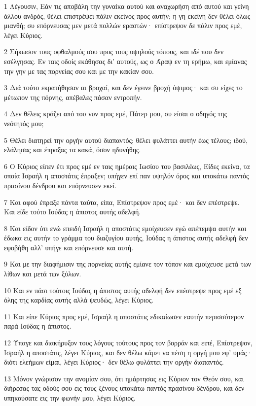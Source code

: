 \par 1 Λέγουσιν, Εάν τις αποβάλη την γυναίκα αυτού και αναχωρήση από αυτού και γείνη άλλου ανδρός, θέλει επιστρέψει πάλιν εκείνος προς αυτήν; η γη εκείνη δεν θέλει όλως μιανθή; συ επόρνευσας μεν μετά πολλών εραστών· επίστρεψον δε πάλιν προς εμέ, λέγει Κύριος.
\par 2 Σήκωσον τους οφθαλμούς σου προς τους υψηλούς τόπους, και ιδέ που δεν εσέλγησας. Εν ταις οδοίς εκάθησας δι' αυτούς, ως ο Άραψ εν τη ερήμω, και εμίανας την γην με τας πορνείας σου και με την κακίαν σου.
\par 3 Διά τούτο εκρατήθησαν αι βροχαί, και δεν έγεινε βροχή όψιμος· και συ είχες το μέτωπον της πόρνης, απέβαλες πάσαν εντροπήν.
\par 4 Δεν θέλεις κράζει από του νυν προς εμέ, Πάτερ μου, συ είσαι ο οδηγός της νεότητός μου;
\par 5 Θέλει διατηρεί την οργήν αυτού διαπαντός; θέλει φυλάττει αυτήν έως τέλους; ιδού, ελάλησας και έπραξας τα κακά, όσον ηδυνήθης.
\par 6 Ο Κύριος είπεν έτι προς εμέ εν ταις ημέραις Ιωσίου του βασιλέως, Είδες εκείνα, τα οποία Ισραήλ η αποστάτις έπραξεν; υπήγεν επί παν υψηλόν όρος και υποκάτω παντός πρασίνου δένδρου και επόρνευσεν εκεί.
\par 7 Και αφού έπραξε πάντα ταύτα, είπα, Επίστρεψον προς εμέ· και δεν επέστρεψε. Και είδε τούτο Ιούδας η άπιστος αυτής αδελφή.
\par 8 Και είδον ότι ενώ επειδή Ισραήλ η αποστάτις εμοίχευσεν εγώ απέπεμψα αυτήν και έδωκα εις αυτήν το γράμμα του διαζυγίου αυτής, Ιούδας η άπιστος αυτής αδελφή δεν εφοβήθη αλλ' υπήγε και επόρνευσε και αυτή.
\par 9 Και με την διαφήμισιν της πορνείας αυτής εμίανε τον τόπον και εμοίχευσε μετά των λίθων και μετά των ξύλων.
\par 10 Και εν πάσι τούτοις Ιούδας η άπιστος αυτής αδελφή δεν επέστρεψε προς εμέ εξ όλης της καρδίας αυτής αλλά ψευδώς, λέγει Κύριος.
\par 11 Και είπε Κύριος προς εμέ, Ισραήλ η αποστάτις εδικαίωσεν εαυτήν περισσότερον παρά Ιούδας η άπιστος.
\par 12 Ύπαγε και διακήρυξον τους λόγους τούτους προς τον βορράν και ειπέ, Επίστρεψον, Ισραήλ η αποστάτις, λέγει Κύριος, και δεν θέλω κάμει να πέση η οργή μου εφ' υμάς· διότι ελεήμων είμαι, λέγει Κύριος· δεν θέλω φυλάττει την οργήν διαπαντός.
\par 13 Μόνον γνώρισον την ανομίαν σου, ότι ημάρτησας εις Κύριον τον Θεόν σου, και διήρεσας τας οδούς σου εις τους ξένους υποκάτω παντός πρασίνου δένδρου, και δεν υπηκούσατε εις την φωνήν μου, λέγει Κύριος.
